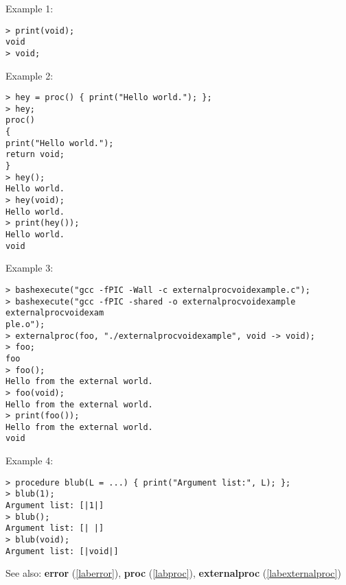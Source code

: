 \noindent Example 1: 
\begin{center}\begin{minipage}{15cm}\begin{Verbatim}[frame=single,commandchars=\\\|\~]
> print(void);
void
> void;
\end{Verbatim}
\end{minipage}\end{center}
\noindent Example 2: 
\begin{center}\begin{minipage}{15cm}\begin{Verbatim}[frame=single,commandchars=\\\|\~]
> hey = proc() { print("Hello world."); };
> hey;
proc()
{
print("Hello world.");
return void;
}
> hey();
Hello world.
> hey(void);
Hello world.
> print(hey());
Hello world.
void
\end{Verbatim}
\end{minipage}\end{center}
\noindent Example 3: 
\begin{center}\begin{minipage}{15cm}\begin{Verbatim}[frame=single,commandchars=\\\|\~]
> bashexecute("gcc -fPIC -Wall -c externalprocvoidexample.c");
> bashexecute("gcc -fPIC -shared -o externalprocvoidexample externalprocvoidexam
ple.o");
> externalproc(foo, "./externalprocvoidexample", void -> void);
> foo;
foo
> foo();
Hello from the external world.
> foo(void);
Hello from the external world.
> print(foo());
Hello from the external world.
void
\end{Verbatim}
\end{minipage}\end{center}
\noindent Example 4: 
\begin{center}\begin{minipage}{15cm}\begin{Verbatim}[frame=single,commandchars=\\\|\~]
> procedure blub(L = ...) { print("Argument list:", L); };
> blub(1);
Argument list: [|1|]
> blub();
Argument list: [| |]
> blub(void); 
Argument list: [|void|]
\end{Verbatim}
\end{minipage}\end{center}
See also: \textbf{error} (\ref{laberror}), \textbf{proc} (\ref{labproc}), \textbf{externalproc} (\ref{labexternalproc})
